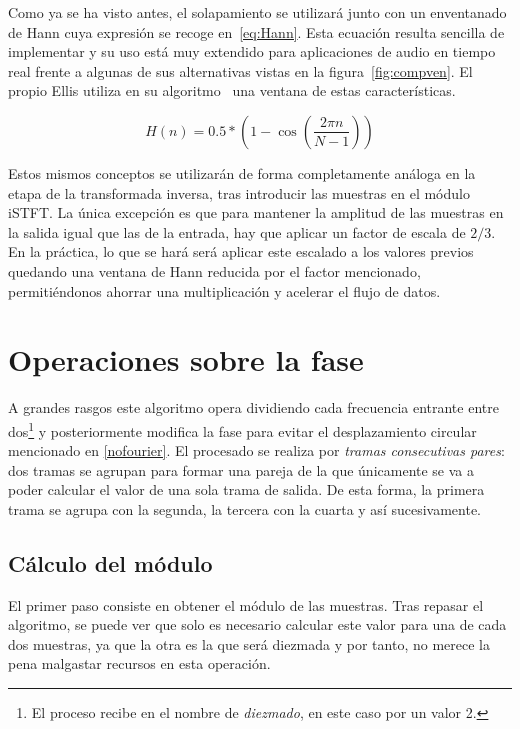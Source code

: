 Como ya se ha visto antes, el solapamiento se utilizará junto con un enventanado de Hann cuya expresión se recoge en~\ref{eq:Hann}. Esta ecuación resulta sencilla de implementar y su uso está muy extendido para aplicaciones de audio en tiempo real frente a algunas de sus alternativas vistas en la figura~\ref{fig:compven}. El propio Ellis utiliza en su algoritmo~\cite{Ellis} una ventana de estas características.

\begin{equation}
\label{eq:Hann}
 H(n) = 0.5 * \left(1 - \cos\left(\frac{2\pi n}{N - 1}\right)\right)
 \end{equation} 
 
Estos mismos conceptos se utilizarán de forma completamente análoga en la etapa de la transformada inversa, tras introducir las muestras en el módulo iSTFT. La única excepción es que para mantener la amplitud de las muestras en la salida igual que las de la entrada, hay que aplicar un factor de escala de $2/3$. En la práctica, lo que se hará será aplicar este escalado a los valores previos quedando una ventana de Hann reducida por el factor mencionado, permitiéndonos ahorrar una multiplicación y acelerar el flujo de datos.

\section{Operaciones sobre la fase}
A grandes rasgos este algoritmo opera dividiendo cada frecuencia entrante entre dos\footnote{El proceso recibe en \cite{Oppenheim} el nombre de \emph{diezmado}, en este caso por un valor 2.} y posteriormente modifica la fase para evitar el desplazamiento circular mencionado en \ref{nofourier}. El procesado se realiza por \emph{tramas consecutivas pares}: dos tramas se agrupan para formar una pareja de la que únicamente se va a poder calcular el valor de una sola trama de salida. De esta forma, la primera trama se agrupa con la segunda, la tercera con la cuarta y así sucesivamente.

\subsection{Cálculo del módulo}
El primer paso consiste en obtener el módulo de las muestras. Tras repasar el algoritmo, se puede ver que solo es necesario calcular este valor para una de cada dos muestras, ya que la otra es la que será diezmada y por tanto, no merece la pena malgastar recursos en esta operación. 

